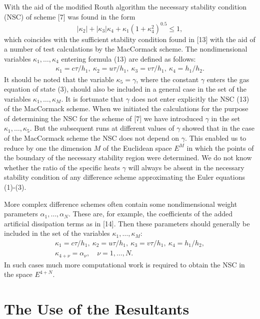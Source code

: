     With the aid of the modified Routh algorithm the necessary stability
condition (NSC) of scheme [7] was found in the form
\begin{equation}
|\kappa_2|+|\kappa_3|\kappa_4 +\kappa_1(1+\kappa_4^2)^{0.5}\leq 1,
\end{equation}
which coincides with the sufficient stability condition found in [13] with the
aid of a number of test calculations by the MacCormack scheme. The
nondimensional variables $\kappa_1,\ldots,\kappa_4$ entering formula (13)
are defined as follows:
\begin{eqnarray}
\kappa_1=c\tau/h_1,~\kappa_2=u\tau/h_1,~\kappa_3=v\tau/h_1,~\kappa_4=h_1/h_2.
\end{eqnarray}
It should be noted that the variable $\kappa_5=\gamma$, where the constant
$\gamma$ enters the gas equation of state (3), should also be included in a
general case in the set of the variables $\kappa_1,\ldots,\kappa_M$. It is
fortunate that $\gamma$ does not enter explicitly the NSC (13) of the
MacCormack scheme. When we initiated the calculations for the purpose of
determining the NSC for the scheme of [7] we have introduced $\gamma$ in the
set $\kappa_1,\ldots,\kappa_5$. But the subsequent runs at different values of
$\gamma$ showed that in the case of the MacCormack scheme the NSC does not
depend on $\gamma$. This enabled us to reduce by one the dimension $M$ of the
Euclidean space $E^M$ in which the points of the boundary of the necessary
stability region were determined. We do not know whether the ratio of the
specific heats $\gamma$ will always be absent in the necessary stability
condition of any difference scheme approximating the Euler equations (1)-(3).

   More complex difference schemes often contain some nondimensional weight
parameters $\alpha_1,\ldots,\alpha_N$. These are, for example, the coefficients
of the added artificial dissipation terms as in [14]. Then these parameters
should generally be included in the set of the variables $\kappa_1,\ldots,
\kappa_M$:
\begin{eqnarray*}
\kappa_1=c\tau/h_1,~\kappa_2=u\tau/h_1,~\kappa_3=v\tau/h_1,~\kappa_4=h_1/h_2,\\
\kappa_{4+\nu}=\alpha_\nu,\quad \nu=1,\ldots,N.
\end{eqnarray*}
In such cases much more computational work is required to obtain the NSC in
the space $E^{4+N}$.

\section{The Use of the Resultants}
\hspace{6mm}


